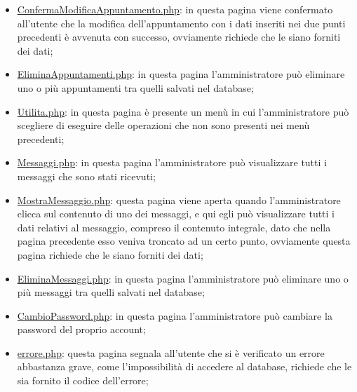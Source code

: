 {\begin{itemize}
		\item \underline{ConfermaModificaAppuntamento.php}: in questa pagina viene confermato all'utente che la modifica dell'appuntamento con i dati inseriti nei due punti precedenti è avvenuta con successo, ovviamente richiede che le siano forniti dei dati;
		\item \href{http://tecweb2016.studenti.math.unipd.it/smarches/EliminaAppuntamenti.php}{EliminaAppuntamenti.php}: in questa pagina l'amministratore può eliminare uno o più appuntamenti tra quelli salvati nel database;
		\item \href{http://tecweb2016.studenti.math.unipd.it/smarches/Utilita.php}{Utilita.php}: in questa pagina è presente un menù in cui l'amministratore può scegliere di eseguire delle operazioni che non sono presenti nei menù precedenti;
		\item \href{http://tecweb2016.studenti.math.unipd.it/smarches/Messaggi.php}{Messaggi.php}: in questa pagina l'amministratore può visualizzare tutti i messaggi che sono stati ricevuti;
		\item \underline{MostraMessaggio.php}: questa pagina viene aperta quando l'amministratore clicca sul contenuto di uno dei messaggi, e qui egli può visualizzare tutti i dati relativi al messaggio, compreso il contenuto integrale, dato che nella pagina precedente esso veniva troncato ad un certo punto, ovviamente questa pagina richiede che le siano forniti dei dati;
		\item \href{http://tecweb2016.studenti.math.unipd.it/smarches/EliminaMessaggi.php}{EliminaMessaggi.php}: in questa pagina l'amministratore può eliminare uno o più messaggi tra quelli salvati nel database;
		\item \href{http://tecweb2016.studenti.math.unipd.it/smarches/CambioPassword.php}{CambioPassword.php}: in questa pagina l'amministratore può cambiare la password del proprio account;
		\item \underline{errore.php}: questa pagina segnala all'utente che si è verificato un errore abbastanza grave, come l'impossibilità di accedere al database, richiede che le sia fornito il codice dell'errore;
	\end{itemize}
}